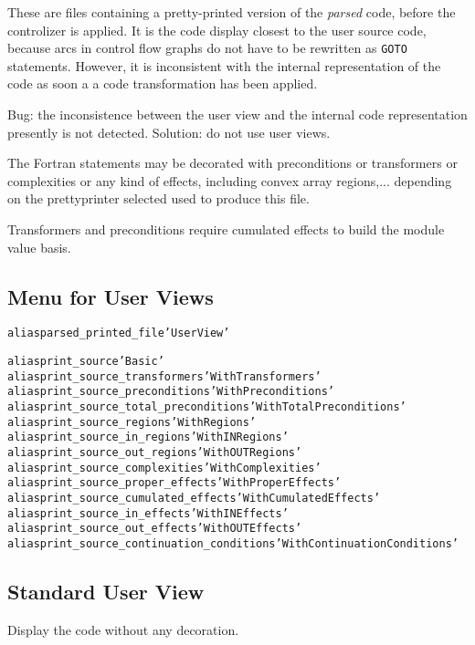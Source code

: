 \documentclass[a4paper]{report}
\newenvironment{PipsMake}{\begin{alltt}}{\end{alltt}}
\newenvironment{PipsPass}[1]{\label{pass:#1}}{}
\begin{document}
\begin{PipsPass}{parsed_printed_file}
\label{sec:parsed_printed_files}
\label{subsection-parsed-printed-files}
These are files containing a pretty-printed version of the {\em parsed} code,
before the controlizer is applied. It is the code display closest to the
user source code, because arcs in control flow graphs do not have to be
rewritten as {\tt GOTO} statements. However, it is inconsistent with the
internal representation of the code as soon a a code transformation
has been applied.

Bug: the inconsistence between the user view and the internal code
representation presently is not detected. Solution: do not use user views.

The Fortran statements may be
decorated with preconditions or transformers or complexities or any kind
of effects, including convex array regions,... depending on the
prettyprinter selected used to produce this file.

Transformers and preconditions require cumulated effects to build the
module value basis.
\end{PipsPass}

\subsection{Menu for User Views}

\begin{PipsMake}
alias parsed_printed_file 'User View'

alias print_source 'Basic'
alias print_source_transformers 'With Transformers'
alias print_source_preconditions 'With Preconditions'
alias print_source_total_preconditions 'With Total Preconditions'
alias print_source_regions 'With Regions'
alias print_source_in_regions 'With IN Regions'
alias print_source_out_regions 'With OUT Regions'
alias print_source_complexities 'With Complexities'
alias print_source_proper_effects 'With Proper Effects'
alias print_source_cumulated_effects 'With Cumulated Effects'
alias print_source_in_effects 'With IN Effects'
alias print_source_out_effects 'With OUT Effects'
alias print_source_continuation_conditions 'With Continuation Conditions'
\end{PipsMake}

\subsection{Standard User View}

\begin{PipsPass}{print_source}
Display the code without any decoration.
\end{PipsPass}
\end{document}
